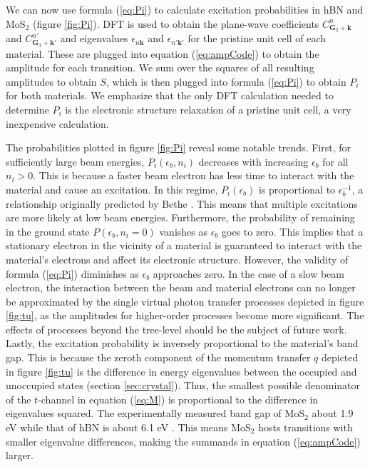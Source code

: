 \documentclass{article}
\begin{document}
We can now use formula (\ref{eq:Pi}) to calculate excitation probabilities in
hBN and MoS$_2$ (figure \ref{fig:Pi}).
DFT is used to obtain the plane-wave coefficients $C_{\mathbf{G}_2
+\mathbf{k}}^n$ and $C_{\mathbf{G}_3+\mathbf{k'}}^{n'}$ and eigenvalues
$\epsilon_{n\mathbf{k}}$ and $\epsilon_{n'\mathbf{k'}}$ for the pristine unit
cell of each material.
These are plugged into equation (\ref{eq:ampCode}) to obtain the amplitude for
each transition.
We sum over the squares of all resulting amplitudes to obtain $S$, which is
then plugged into formula (\ref{eq:Pi}) to obtain $P_i$ for both materials.
We emphasize that the only DFT calculation needed to determine $P_i$ is the
electronic structure relaxation of a pristine unit cell, a very inexpensive
calculation.

The probabilities plotted in figure \ref{fig:Pi} reveal some notable
trends.
First, for sufficiently large beam energies, $P_i(\epsilon_b, n_i)$ decreases
with increasing $\epsilon_b$ for all $n_i>0$.
This is because a faster beam electron has less time to interact with the
material and cause an excitation.
In this regime, $P_i(\epsilon_b)$ is proportional to $\epsilon_b^{-1}$, a
relationship originally predicted by Bethe \cite{Bethe1930, Inokuti1967,
Kretschmer2020}.
This means that multiple excitations are more likely at low beam energies.
Furthermore, the probability of remaining in the ground state $P(\epsilon_b,
n_i=0)$ vanishes as $\epsilon_b$ goes to zero.
This implies that a stationary electron in the vicinity of a material is
guaranteed to interact with the material's electrons and affect its electronic
structure.
However, the validity of formula (\ref{eq:Pi}) diminishes as $\epsilon_b$
approaches zero.
In the case of a slow beam electron, the interaction between the beam and
material electrons can no longer be approximated by the single virtual photon
transfer processes depicted in figure \ref{fig:tu}, as the amplitudes for
higher-order processes become more significant.
The effects of processes beyond the tree-level should be the subject of future
work.
Lastly, the excitation probability is inversely proportional to the material's
band gap.
This is because the zeroth component of the momentum transfer $q$ depicted in
figure \ref{fig:tu} is the difference in energy eigenvalues between the
occupied and unoccupied states (section \ref{sec:crystal}).
Thus, the smallest possible denominator of the $t$-channel in equation
(\ref{eq:M}) is proportional to the difference in eigenvalues squared.
The experimentally measured band gap of MoS$_2$ about 1.9 eV \cite{Gusakova2017}
while that of hBN is about 6.1 eV \cite{Elias2019}.
This means MoS$_2$ hosts transitions with smaller eigenvalue differences,
making the summands in equation (\ref{eq:ampCode}) larger.
\end{document}
